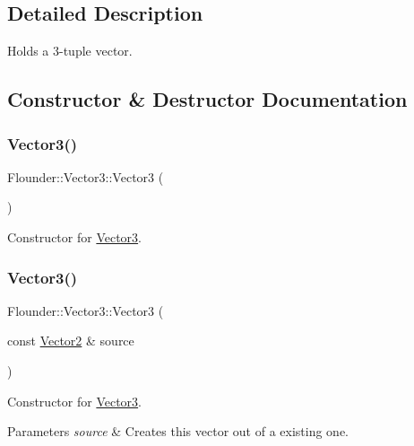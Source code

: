 \subsection{Detailed Description}
Holds a 3-\/tuple vector. 



\subsection{Constructor \& Destructor Documentation}
\mbox{\label{class_flounder_1_1_vector3_a7e2f110745a058410ab80bbdbff4adce}} 
\subsubsection{\texorpdfstring{Vector3()}{Vector3()}\hspace{0.1cm}{\footnotesize\ttfamily [1/5]}}
{\footnotesize\ttfamily Flounder\+::\+Vector3\+::\+Vector3 (\begin{DoxyParamCaption}{ }\end{DoxyParamCaption})}



Constructor for \hyperlink{class_flounder_1_1_vector3}{Vector3}. 

\mbox{\label{class_flounder_1_1_vector3_adc360c97ea45b35edd49801c0859bb45}} 
\subsubsection{\texorpdfstring{Vector3()}{Vector3()}\hspace{0.1cm}{\footnotesize\ttfamily [2/5]}}
{\footnotesize\ttfamily Flounder\+::\+Vector3\+::\+Vector3 (\begin{DoxyParamCaption}\item[{const \hyperlink{class_flounder_1_1_vector2}{Vector2} \&}]{source }\end{DoxyParamCaption})}



Constructor for \hyperlink{class_flounder_1_1_vector3}{Vector3}. 


\begin{DoxyParams}{Parameters}
{\em source} & Creates this vector out of a existing one. \\
\hline
\end{DoxyParams}
\mbox{\label{class_flounder_1_1_vector3_a67f3be4dfd3f0021b1a58e9fe41863cd}} 
